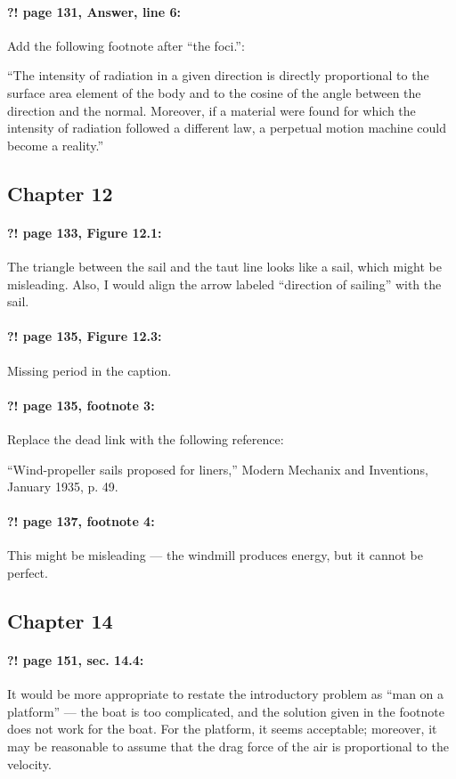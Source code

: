 \documentclass[twoside]{article}
\begin{document}
\paragraph{?! page 131, Answer, line 6:} Add the following footnote after ``the foci.'':

``The intensity of radiation in a given direction is directly proportional to the surface area element of the body and to the cosine of the angle between the direction and the normal. Moreover, if a material were found for which the intensity of radiation followed a different law, a perpetual motion machine could become a reality.''

\subsection*{Chapter 12}

\paragraph{?! page 133, Figure 12.1:} The triangle between the sail and the taut line looks like a sail, which might be misleading. Also, I would align the arrow labeled ``direction of sailing'' with the sail.

\paragraph{?! page 135, Figure 12.3:} Missing period in the caption.

\paragraph{?! page 135, footnote 3:} Replace the dead link with the following reference:

``Wind-propeller sails proposed for liners,'' Modern Mechanix and Inventions, January 1935, p. 49.

\paragraph{?! page 137, footnote 4:} This might be misleading — the windmill produces energy, but it cannot be perfect.

\subsection*{Chapter 14}

\paragraph{?! page 151, sec. 14.4:} It would be more appropriate to restate the introductory problem as ``man on a platform'' — the boat is too complicated, and the solution given in the footnote does not work for the boat. For the platform, it seems acceptable; moreover, it may be reasonable to assume that the drag force of the air is proportional to the velocity.
\end{document}
